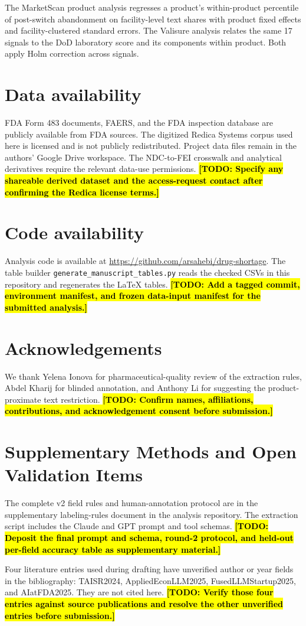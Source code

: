 \documentclass[12pt]{article}
\newcommand{\todo}[1]{\hl{\textbf{[TODO: #1]}}}
\begin{document}
The MarketScan product analysis regresses a product's within-product
percentile of post-switch abandonment on facility-level text shares with
product fixed effects and facility-clustered standard errors. The Valisure
analysis relates the same 17 signals to the DoD laboratory score and its
components within product. Both apply Holm correction across signals.

\section*{Data availability}

FDA Form 483 documents, FAERS, and the FDA inspection database are
publicly available from FDA sources. The digitized Redica Systems corpus
used here is licensed and is not publicly redistributed. Project data
files remain in the authors' Google Drive workspace. The NDC-to-FEI
crosswalk and analytical derivatives require the relevant data-use
permissions. \todo{Specify any shareable derived dataset and the
access-request contact after confirming the Redica license terms.}

\section*{Code availability}

Analysis code is available at \url{https://github.com/arsahebi/drug-shortage}.
The table builder \texttt{generate\_manuscript\_tables.py} reads the
checked CSVs in this repository and regenerates the LaTeX tables.
\todo{Add a tagged commit, environment manifest, and frozen data-input
manifest for the submitted analysis.}

\section*{Acknowledgements}

We thank Yelena Ionova for pharmaceutical-quality review of the extraction
rules, Abdel Kharij for blinded annotation, and Anthony Li for suggesting the
product-proximate text restriction. \todo{Confirm names, affiliations,
contributions, and acknowledgement consent before submission.}




\appendix
\section{Supplementary Methods and Open Validation Items}

The complete v2 field rules and human-annotation protocol are in the
supplementary labeling-rules document in the analysis repository.
The extraction script includes the Claude and GPT prompt and tool schemas.
\todo{Deposit the final prompt and schema, round-2 protocol, and held-out
per-field accuracy table as supplementary material.}

Four literature entries used during drafting have unverified author or
year fields in the bibliography: TAISR2024, AppliedEconLLM2025,
FusedLLMStartup2025, and AIatFDA2025. They are not cited here.
\todo{Verify those four entries against source publications and resolve
the other unverified entries before submission.}
\end{document}
